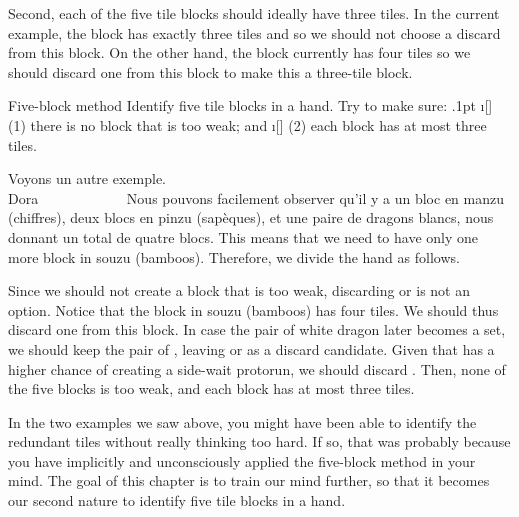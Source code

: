 \bigskip
Second, each of the five tile blocks should ideally have three tiles. In the current example, the {\LARGE{}} block has exactly three tiles and so we should not choose a discard from this block. On the other hand, the {\LARGE{}} block currently has four tiles so we should discard one from this block to make this a three-tile block. 

\vfill
\color{MyRed}
\begin{itembox}[c]{Five-block method}\normalcolor
Identify five tile blocks in a hand. Try to make sure: 
\bi\itemsep.1pt
\i[] (1) there is no block that is too weak; and 
\i[] (2) each block has at most three tiles. 
\ei
\end{itembox}\normalcolor

\newpage
Voyons un autre exemple. 
\bp
{}\bai\bai~\bai\\
\hfill\footnotesize{{\jap Dora}~~~~~~~~~~~~}
\ep
Nous pouvons facilement observer qu'il y a un bloc en {\jap manzu} (chiffres), deux blocs en {\jap pinzu} (sapèques), et une paire de dragons blancs, nous donnant un total de quatre blocs. This means that we need to have only one more block in {\jap souzu} (bamboos). Therefore, we divide the hand as follows. 

\emj
Since we should not create a block that is too weak, discarding {\LARGE{}} or {\LARGE{}} is not an option. Notice that the block in {\jap souzu} (bamboos) has four tiles. We should thus discard one from this block. In case the pair of white dragon later becomes a set, we should keep the pair of {\LARGE{}}, leaving {\LARGE{}} or {\LARGE{}} as a discard candidate. Given that {\LARGE{}} has a higher chance of creating a side-wait protorun, we should discard {\LARGE{}}. 
Then, none of the five blocks is too weak, and each block has at most three tiles. 

\bigskip
In the two examples we saw above, you might have been able to identify the redundant tiles without really thinking too hard. If so, that was probably because you have implicitly and unconsciously applied the five-block method in your mind. The goal of this chapter is to train our mind further, so that it becomes our second nature to identify five tile blocks in a hand. 

